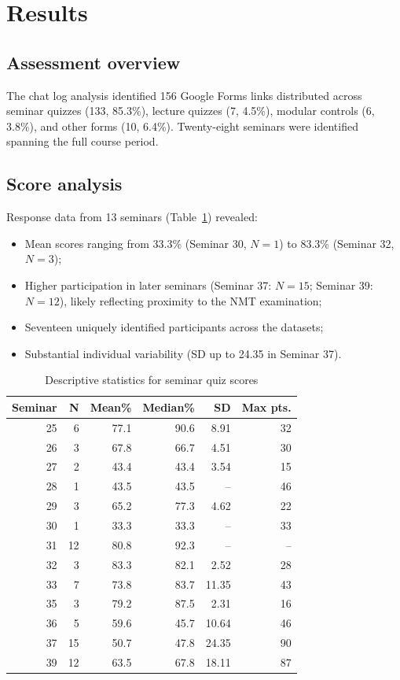 \documentclass[review]{elsarticle}
\begin{document}
\section{Results}

\subsection{Assessment overview}

The chat log analysis identified 156 Google Forms links distributed across seminar quizzes (133, 85.3\%), lecture quizzes (7, 4.5\%), modular controls (6, 3.8\%), and other forms (10, 6.4\%). Twenty-eight seminars were identified spanning the full course period.

\subsection{Score analysis}

Response data from 13 seminars (Table~\ref{tab:scores}) revealed:
\begin{itemize}
\item Mean scores ranging from 33.3\% (Seminar 30, $N=1$) to 83.3\% (Seminar 32, $N=3$);
\item Higher participation in later seminars (Seminar 37: $N=15$; Seminar 39: $N=12$), likely reflecting proximity to the NMT examination;
\item Seventeen uniquely identified participants across the datasets;
\item Substantial individual variability (SD up to 24.35 in Seminar 37).
\end{itemize}

\begin{table}[!h]
\centering
\caption{Descriptive statistics for seminar quiz scores}
\label{tab:scores}
\small
\begin{tabular}{@{}rrrrrr@{}}
\toprule
\textbf{Seminar} & \textbf{N} & \textbf{Mean\%} & \textbf{Median\%} & \textbf{SD} & \textbf{Max pts.} \\
\midrule
25 & 6  & 77.1 & 90.6 & 8.91 & 32 \\
26 & 3  & 67.8 & 66.7 & 4.51 & 30 \\
27 & 2  & 43.4 & 43.4 & 3.54 & 15 \\
28 & 1  & 43.5 & 43.5 & --   & 46 \\
29 & 3  & 65.2 & 77.3 & 4.62 & 22 \\
30 & 1  & 33.3 & 33.3 & --   & 33 \\
31 & 12 & 80.8 & 92.3 & --   & -- \\
32 & 3  & 83.3 & 82.1 & 2.52 & 28 \\
33 & 7  & 73.8 & 83.7 & 11.35 & 43 \\
35 & 3  & 79.2 & 87.5 & 2.31 & 16 \\
36 & 5  & 59.6 & 45.7 & 10.64 & 46 \\
37 & 15 & 50.7 & 47.8 & 24.35 & 90 \\
39 & 12 & 63.5 & 67.8 & 18.11 & 87 \\
\bottomrule
\end{tabular}
\end{table}
\end{document}

